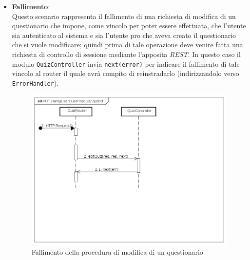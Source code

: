 \begin{itemize}
\item \textbf{Fallimento}:\\
Questo scenario rappresenta il fallimento di una richiesta di modifica di un questionario che impone, come vincolo per poter essere effettuata, che l'utente sia autenticato al sistema e sia l'utente pro che aveva creato il questionario che si vuole modificare; quindi prima di tale operazione deve venire fatta una richiesta di controllo di sessione mediante l'apposita \textit{REST}. In questo caso il modulo \texttt{QuizController} invia \texttt{next(error)} per indicare il fallimento di tale vincolo al router il quale avrà compito di reinstradarlo (indirizzandolo verso \texttt{ErrorHandler}).
\label{Fallimento della procedura di modifica di un questionario}
\begin{figure}[ht]
	\centering
	\includegraphics[scale=0.40]{UML/DiagrammiDiSequenza/Back-end/PUT__lang_user_userId_quiz_quizId_failure.png}
	\caption{Fallimento della procedura di modifica di un questionario}
\end{figure}
\FloatBarrier
\end{itemize}

